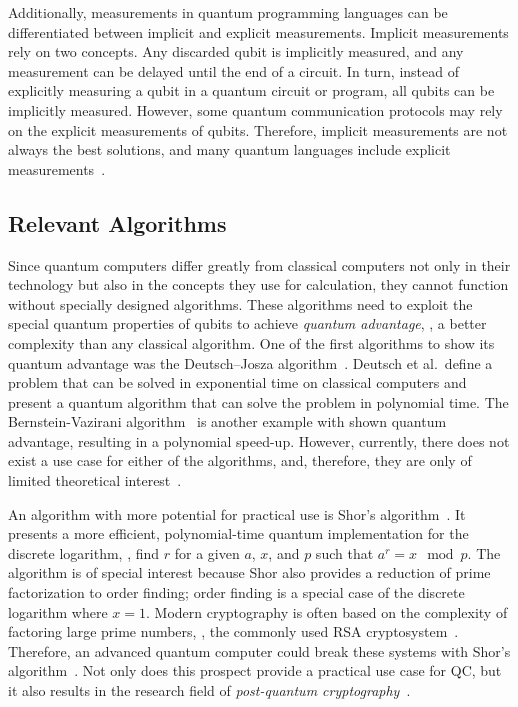 Additionally, measurements in quantum programming languages can be differentiated between implicit and explicit measurements. Implicit measurements rely on two concepts. Any discarded qubit is implicitly measured, and any measurement can be delayed until the end of a circuit. In turn, instead of explicitly measuring a qubit in a quantum circuit or program, all qubits can be implicitly measured. However, some quantum communication protocols may rely on the explicit measurements of qubits. Therefore, implicit measurements are not always the best solutions, and many quantum languages include explicit measurements~\cite{Inou24}.

\subsection{Relevant Algorithms}
\label{sec:background_algorithms}
Since quantum computers differ greatly from classical computers not only in their technology but also in the concepts they use for calculation, they cannot function without specially designed algorithms. These algorithms need to exploit the special quantum properties of qubits to achieve \emph{quantum advantage}, \ie, a better complexity than any classical algorithm. One of the first algorithms to show its quantum advantage was the Deutsch–Josza algorithm~\cite{DeJo92}. Deutsch et al.\ define a problem that can be solved in exponential time on classical computers and present a quantum algorithm that can solve the problem in polynomial time. The Bernstein-Vazirani algorithm~\cite{BeVa93} is another example with shown quantum advantage, resulting in a polynomial speed-up. However, currently, there does not exist a use case for either of the algorithms, and, therefore, they are only of limited theoretical interest~\cite{DiCh20c}.

An algorithm with more potential for practical use is Shor's algorithm~\cite{Shor97}. It presents a more efficient, polynomial-time quantum implementation for the discrete logarithm, \ie, find $r$ for a given $a$, $x$, and $p$ such that $a^r = x \mod p$. The algorithm is of special interest because Shor also provides a reduction of prime factorization to order finding; order finding is a special case of the discrete logarithm where $x = 1$. Modern cryptography is often based on the complexity of factoring large prime numbers, \eg, the commonly used RSA cryptosystem~\cite{RSA78}. Therefore, an advanced quantum computer could break these systems with Shor's algorithm~\cite{MVDJ18}. Not only does this prospect provide a practical use case for QC, but it also results in the research field of \emph{post-quantum cryptography}~\cite{BeLa17}.

